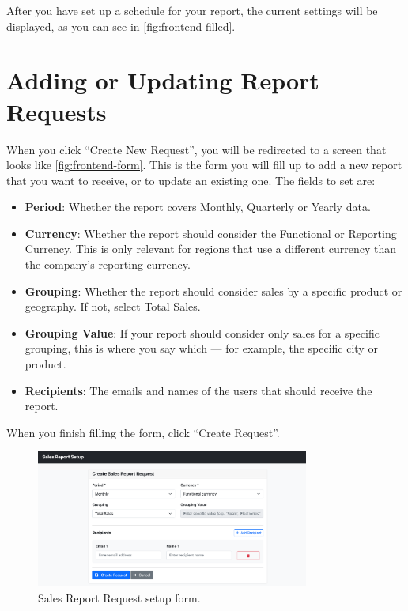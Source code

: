 \documentclass[a4paper]{report}
\begin{document}
After you have set up a schedule for your report, the current settings will be displayed, as you can see in \autoref{fig:frontend-filled}.

\section{Adding or Updating Report Requests}
\label{annex:user-manual-report-request}

When you click ``Create New Request'', you will be redirected to a screen that looks like \autoref{fig:frontend-form}. This is the form you will fill up to add a new report that you want to receive, or to update an existing one. The fields to set are:

\begin{itemize}
    \item \textbf{Period}: Whether the report covers Monthly, Quarterly or Yearly data.
    \item \textbf{Currency}: Whether the report should consider the Functional or Reporting Currency. This is only relevant for regions that use a different currency than the company's reporting currency.
    \item \textbf{Grouping}: Whether the report should consider sales by a specific product or geography. If not, select Total Sales.
    \item \textbf{Grouping Value}: If your report should consider only sales for a specific grouping, this is where you say which --- for example, the specific city or product.
    \item \textbf{Recipients}: The emails and names of the users that should receive the report.
\end{itemize}

When you finish filling the form, click ``Create Request''.

\begin{figure}[h]
\centering
\includegraphics[width=0.8\textwidth]{images/frontend-form.png}
\caption{Sales Report Request setup form.}
\label{fig:frontend-form}
\end{figure}
\end{document}
